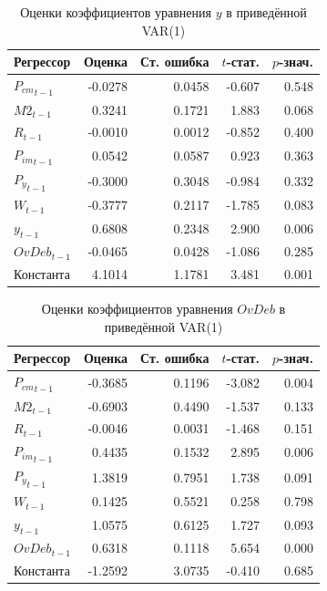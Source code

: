 \begin{table}[H]
\centering
\small

\begin{tabular}{l|r|r|r|r}
\hline
Регрессор & Оценка & Ст. ошибка & $t$-стат. & $p$-знач.\\
\hline
${P_{cm}}_{t-1}$ & -0.0278 & 0.0458 & -0.607 & 0.548\\
\hline
${M2}_{t-1}$ & 0.3241 & 0.1721 & 1.883 & 0.068\\
\hline
${R}_{t-1}$ & -0.0010 & 0.0012 & -0.852 & 0.400\\
\hline
${P_{im}}_{t-1}$ & 0.0542 & 0.0587 & 0.923 & 0.363\\
\hline
${P_y}_{t-1}$ & -0.3000 & 0.3048 & -0.984 & 0.332\\
\hline
${W}_{t-1}$ & -0.3777 & 0.2117 & -1.785 & 0.083\\
\hline
${y}_{t-1}$ & 0.6808 & 0.2348 & 2.900 & 0.006\\
\hline
${OvDeb}_{t-1}$ & -0.0465 & 0.0428 & -1.086 & 0.285\\
\hline
Константа & 4.1014 & 1.1781 & 3.481 & 0.001\\
\hline
\end{tabular}
\caption{Оценки коэффициентов уравнения $y$ в приведённой VAR(1)}
\label{tab:var_coef_gdp}
\end{table}

\begin{table}[H]
\centering
\small

\begin{tabular}{l|r|r|r|r}
\hline
Регрессор & Оценка & Ст. ошибка & $t$-стат. & $p$-знач.\\
\hline
${P_{cm}}_{t-1}$ & -0.3685 & 0.1196 & -3.082 & 0.004\\
\hline
${M2}_{t-1}$ & -0.6903 & 0.4490 & -1.537 & 0.133\\
\hline
${R}_{t-1}$ & -0.0046 & 0.0031 & -1.468 & 0.151\\
\hline
${P_{im}}_{t-1}$ & 0.4435 & 0.1532 & 2.895 & 0.006\\
\hline
${P_y}_{t-1}$ & 1.3819 & 0.7951 & 1.738 & 0.091\\
\hline
${W}_{t-1}$ & 0.1425 & 0.5521 & 0.258 & 0.798\\
\hline
${y}_{t-1}$ & 1.0575 & 0.6125 & 1.727 & 0.093\\
\hline
${OvDeb}_{t-1}$ & 0.6318 & 0.1118 & 5.654 & 0.000\\
\hline
Константа & -1.2592 & 3.0735 & -0.410 & 0.685\\
\hline
\end{tabular}
\caption{Оценки коэффициентов уравнения $OvDeb$ в приведённой VAR(1)}
\label{tab:var_coef_overdue_debt}
\end{table}

